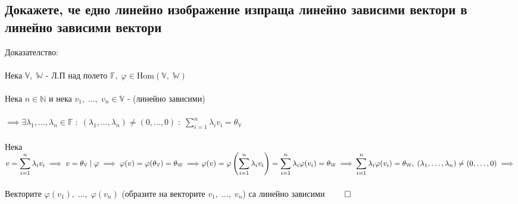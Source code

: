 \documentclass{article}
\newcommand{\V}{\mathbb{V}}
\newcommand{\N}{\mathbb{N}}
\newcommand{\F}{\mathbb{F}}
\newcommand{\W}{\mathbb{W}}
\newcommand{\n}[1]{#1_1, \dots, #1_n}
\newcommand{\OV}{\theta}
\begin{document}
    \subsection{Докажете, че едно линейно изображение изпраща линейно зависими вектори в линейно зависими вектори}
    Доказателство: \\\\
    Нека \(\V, \; \W\) - Л.П над полето \(\F, \; \varphi \in \mathrm{Hom}(\V, \; \W)\) \\\\
    Нека \(n \in \N\) и нека \(v_1, \; \dots, \; v_n \in \V\) - (линейно зависими) \\\\
    \(\implies \exists \n{\lambda} \in \F \; : \;  (\n{\lambda}) \neq (0, \dots, 0) \; : \; \displaystyle\sum_{i = 1}^n \lambda_i v_i = \OV_\V\) \\\\
    Нека \(v = \displaystyle\sum_{i = 1}^n \lambda_i v_i \implies v = \OV_\V \; | \;\varphi
    \implies \varphi(v) = \varphi(\OV_\V) = \OV_\W \implies \\\\
    \varphi(v) = \varphi\left(\displaystyle\sum_{i = 1}^n \lambda_i v_i\right) = \displaystyle\sum_{i = 1}^n \lambda_i \varphi(v_i) = \OV_\W \implies \\\\
    \displaystyle\sum_{i = 1}^n \lambda_i \varphi(v_i) = \OV_\W, \; (\n{\lambda}) \neq (0, \dots, 0) \implies \) \\\\
    Векторите \(\varphi(v_1), \; \dots, \; \varphi(v_n)\) (образите на векторите \(v_1, \; \dots, \; v_n\))
    са линейно зависими \(\qed\) 
\end{document}
